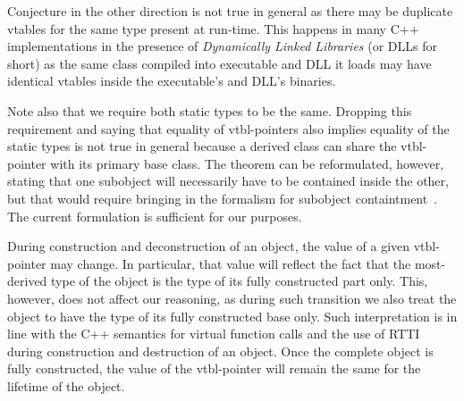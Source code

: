 \noindent
Conjecture in the other direction is not true in general as there may be 
duplicate vtables for the same type present at run-time. This happens in 
many C++ implementations in the presence of \emph{Dynamically Linked Libraries} 
(or DLLs for short) as the same class compiled into executable and DLL it loads 
may have identical vtables inside the executable's and DLL's binaries.

Note also that we require both static types to be the same. Dropping this 
requirement and saying that equality of vtbl-pointers also implies equality of 
the static types is not true in general because a derived class can share the 
vtbl-pointer with its primary base class. The theorem can be reformulated, 
however, stating that one subobject will necessarily have to be contained inside 
the other, but that would require bringing in the formalism for subobject 
containtment~\cite{WNST06}. The current formulation is sufficient for our 
purposes.

%
%
%

During construction and deconstruction of 
an object, the value of a given vtbl-pointer may change. In particular, 
that value will reflect the fact that the most-derived type of the object is the type of its 
fully constructed part only. This, however, does not affect our reasoning, as during 
such transition we also treat the object to have the type of its fully 
constructed base only. Such interpretation is in line with the C++ semantics for 
virtual function calls and the use of RTTI during construction and destruction of an 
object. Once the complete object is fully constructed, the value of the 
vtbl-pointer will remain the same for the lifetime of the object.


